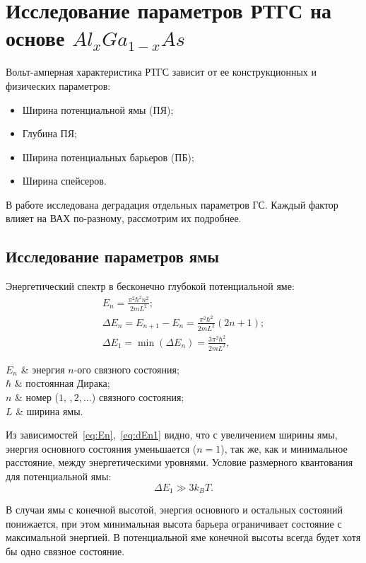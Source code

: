 \chapter{Исследование параметров РТГС на основе $Al_{x}Ga_{1-x}As$}
Вольт-амперная характеристика РТГС зависит от ее конструкционных и физических параметров:
\begin{itemize}
	\item Ширина потенциальной ямы (ПЯ);
	\item Глубина ПЯ;
	\item Ширина потенциальных барьеров (ПБ);
	\item Ширина спейсеров.
\end{itemize}
В работе \cite{Vetrova} исследована деградация отдельных параметров ГС. Каждый фактор влияет на ВАХ по-разному, рассмотрим их подробнее.
\section{Исследование параметров ямы}
Энергетический спектр в бесконечно глубокой потенциальной яме:
\begin{gather}
	\label{eq:En}
	E_{n} = \frac{\pi^{2}\hbar^{2}n^{2}}{2mL^{2}};\\
	\Delta E_{n} = E_{n+1} - E_{n} = \frac{\pi^{2}\hbar^{2}}{2mL^{2}}(2n + 1);\\
	\label{eq:dEn1}
	\Delta E_{1} = \min(\Delta E_{n}) = \frac{3\pi^{2}\hbar^{2}}{2mL^{2}},
\end{gather}
\begin{conditions}
	$E_{n}$ & энергия $n$-ого связного состояния;\\
	$\hbar$ & постоянная Дирака;\\
	$n$ & номер ($1,\,,2,\dots$) связного состояния;\\
	$L$ & ширина ямы.
\end{conditions}

Из зависимостей~\ref{eq:En},~\ref{eq:dEn1}  видно, что с увеличением ширины ямы, энергия основного состояния уменьшается ($n = 1$), так же, как и минимальное расстояние, между энергетическими уровнями. Условие размерного квантования для потенциальной ямы:
\begin{equation}
	\Delta E_{1} \gg 3k_{B}T.
\end{equation}

В случаи ямы с конечной высотой, энергия основного и остальных состояний понижается, при этом минимальная высота барьера ограничивает состояние с максимальной энергией. В потенциальной яме конечной высоты всегда будет хотя бы одно связное состояние.

